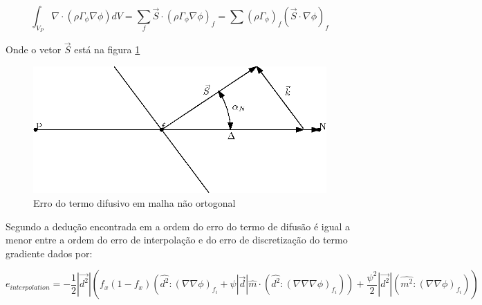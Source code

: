 \begin{equation}
    \int_{V_P} \nabla \cdot (\rho \Gamma_\phi \nabla\phi)dV = \sum_f \vec{S} \cdot (\rho \Gamma_\phi \nabla \phi)_f = \sum (\rho \Gamma_\phi)_f (\vec{S} \cdot \nabla \phi)_f
\end{equation}

Onde o vetor $\vec{S}$ está na figura \ref{fig:non-orthogonality}

\begin{figure}[]
    \centering
    \includegraphics{fig/non-orthogonality.eps}
    \caption{Erro do termo difusivo em malha não ortogonal}
    \label{fig:non-orthogonality}
\end{figure}





Segundo a dedução encontrada em \cite{Juretic2004} a ordem do erro do termo de difusão é igual a menor entre a ordem do erro de interpolação e do erro de discretização do termo gradiente dados por:

\begin{equation}
    e_{interpolation} = -\frac{1}{2} |\vec{d^2}| (f_x(1-f_x)(\hat{d^2}:(\nabla \nabla \phi)_{f_i} + \psi |\vec{d}| \hat{m} \cdot (\hat{d^2} : (\nabla \nabla \nabla \phi)_{f_i})) + \frac{\psi^2}{2} |\vec{d^2}| (\hat{m^2} : (\nabla \nabla \phi)_{f_i}) )
    \label{eq:2.49}
\end{equation}

